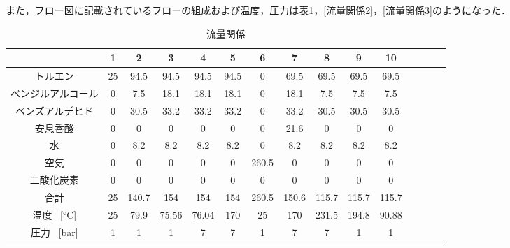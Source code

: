 \documentclass[a4j]{jsreport}
\begin{document}
また，フロー図に記載されているフローの組成および温度，圧力は表\ref{流量関係1}，\ref{流量関係2}，\ref{流量関係3}のようになった．
\begin{table}[htbp]
  \centering
  \caption{流量関係}
  \label{流量関係1}
  \begin{tabular}{ccccccccccccccc}
    \hline
    [\si{\kilo \mole \per \hour}] & 1 & 2 & 3 & 4 & 5 & 6 & 7 & 8 & 9 & 10 \\
    \hline
    トルエン & 25 & 94.5 & 94.5 & 94.5 & 94.5 & 0 & 69.5 & 69.5 & 69.5 & 69.5 \\
    ベンジルアルコール & 0 & 7.5 & 18.1 & 18.1 & 18.1 & 0 & 18.1 & 7.5 & 7.5 & 7.5 \\
    ベンズアルデヒド & 0 & 30.5 & 33.2 & 33.2 & 33.2 & 0 & 33.2 & 30.5 & 30.5 & 30.5 \\
    安息香酸 & 0 & 0 & 0 & 0 & 0 & 0 & 21.6 & 0 & 0 & 0 \\
    水 & 0 & 8.2 & 8.2 & 8.2 & 8.2 & 0 & 8.2 & 8.2 & 8.2 & 8.2 \\
    空気 & 0 & 0 & 0 & 0 & 0 & 260.5 & 0 & 0 & 0 & 0 \\
    二酸化炭素 & 0 & 0 & 0 & 0 & 0 & 0 & 0 & 0 & 0 & 0 \\
    \hline
    合計 & 25 & 140.7 & 154 & 154 & 154 & 260.5 & 150.6 & 115.7 & 115.7 & 115.7 \\
    \hline
    温度 \, [\si{\degreeCelsius}] & 25 & 79.9 & 75.56 & 76.04 & 170 & 25 & 170 & 231.5 & 194.8 & 90.88 \\
    圧力 \, [\si{\bar}] & 1 & 1 & 1 & 7 & 7 & 1 & 7 & 7 & 1 & 1 \\
    \hline
  \end{tabular}
\end{table}
\end{document}
